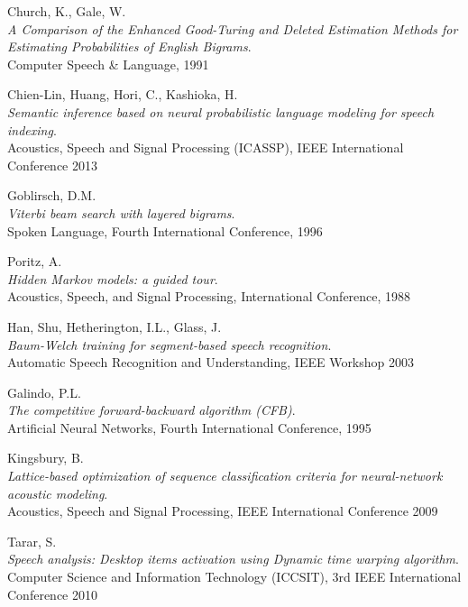 \begin{thebibliography}{99}
  {\sc Church,} K., {\sc Gale,} W.\\
  \emph{A Comparison of the Enhanced Good-Turing and Deleted Estimation Methods for Estimating Probabilities of English Bigrams}.\\
  Computer Speech \& Language, 1991

  {\sc Chien-Lin,} Huang, {\sc Hori,} C., {\sc Kashioka,} H.\\
  \emph{Semantic inference based on neural probabilistic language modeling for speech indexing}.\\
  Acoustics, Speech and Signal Processing (ICASSP), IEEE International Conference 2013

  {\sc Goblirsch,} D.M.\\
  \emph{Viterbi beam search with layered bigrams}.\\
  Spoken Language, Fourth International Conference, 1996

  {\sc Poritz,} A.\\
  \emph{Hidden Markov models: a guided tour}.\\
  Acoustics, Speech, and Signal Processing, International Conference, 1988

  {\sc Han,} Shu, {\sc Hetherington,} I.L., {\sc Glass,} J.\\
  \emph{Baum-Welch training for segment-based speech recognition}.\\
  Automatic Speech Recognition and Understanding, IEEE Workshop 2003

  {\sc Galindo,} P.L.\\
  \emph{The competitive forward-backward algorithm (CFB)}.\\
  Artificial Neural Networks, Fourth International Conference, 1995
  
  {\sc Kingsbury,} B.\\
  \emph{Lattice-based optimization of sequence classification criteria for neural-network acoustic modeling}.\\
  Acoustics, Speech and Signal Processing, IEEE International Conference 2009

  {\sc Tarar,} S.\\
  \emph{Speech analysis: Desktop items activation using Dynamic time warping algorithm}.\\
  Computer Science and Information Technology (ICCSIT), 3rd IEEE International Conference 2010 


\end{thebibliography}

